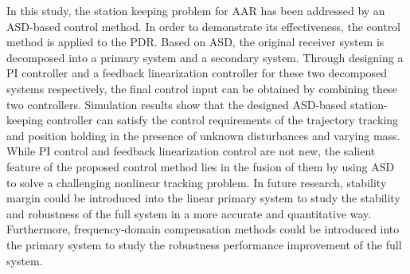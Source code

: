 In this study, the station keeping problem for AAR has been addressed by an
ASD-based control method. In order to demonstrate its effectiveness, the
control method is applied to the PDR. Based on ASD, the original receiver
system is decomposed into a primary system and a secondary system. Through
designing a PI controller and a feedback linearization controller for these
two decomposed systems respectively, the final control input can be obtained
by combining these two controllers. Simulation results show that the
designed ASD-based station-keeping controller can satisfy the control
requirements of the trajectory tracking and position holding in the presence
of unknown disturbances and varying mass. While PI control and feedback
linearization control are not new, the salient feature of the proposed
control method lies in the fusion of them by using ASD to solve a
challenging nonlinear tracking problem. In future research, stability margin
could be introduced into the linear primary system to study the stability
and robustness of the full system in a more accurate and quantitative way.
Furthermore, frequency-domain compensation methods could be introduced into
the primary system to study the robustness performance improvement of the
full system.